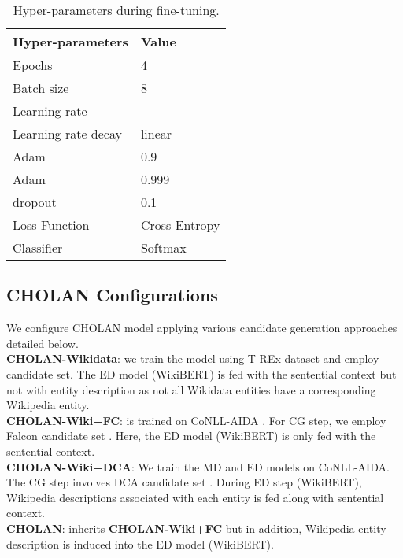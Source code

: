 \documentclass[11pt,a4paper]{article}
\begin{document}
\begin{table}[!htp]
\centering
\begin{tabular}{ll}
\toprule
{\textbf{Hyper-parameters}} &  {\textbf{Value}}  \\
\midrule
Epochs & 4 \\
Batch size & 8 \\
Learning rate &  \\
Learning rate decay & linear \\
Adam  & 0.9  \\
Adam  & 0.999  \\
dropout & 0.1 \\
Loss Function & Cross-Entropy \\
Classifier & Softmax \\
\bottomrule
\end{tabular}
\caption{Hyper-parameters during fine-tuning.}
\label{tab:Hyperparameters}
\end{table}

\subsection{CHOLAN Configurations} \label{sec:config}
We configure CHOLAN model applying various candidate generation approaches detailed below.\\
\textbf{CHOLAN-Wikidata}: we train the model using T-REx dataset and employ  candidate set. The ED model (WikiBERT) is fed with the sentential context but not with entity description as not all Wikidata entities have a corresponding Wikipedia entity. \\
\textbf{CHOLAN-Wiki+FC}: is trained on CoNLL-AIDA \cite{DBLP:conf/emnlp/HoffartYBFPSTTW11}. For CG step, we employ Falcon candidate set . 
Here, the ED model (WikiBERT) is only fed with the sentential context.\\
\textbf{CHOLAN-Wiki+DCA}: We train the MD and ED models on CoNLL-AIDA. The CG step involves DCA candidate set . During ED step (WikiBERT), Wikipedia descriptions associated with each entity is fed along with sentential context.\\
\textbf{CHOLAN}: inherits \textbf{CHOLAN-Wiki+FC} but in addition, Wikipedia entity description is induced into the ED model (WikiBERT).
\end{document}
